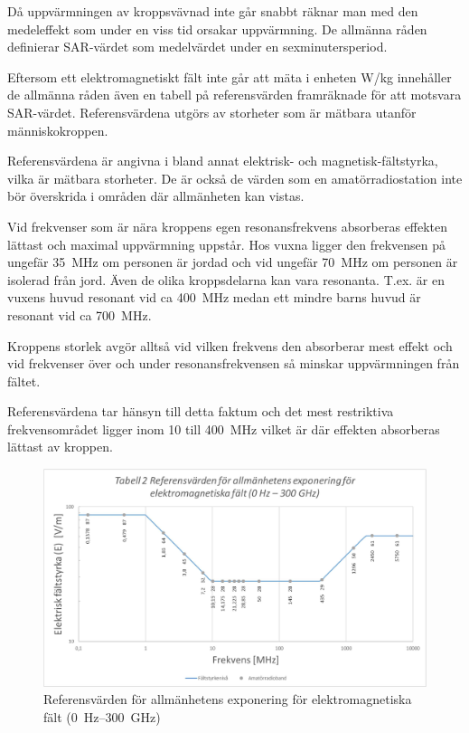 Då uppvärmningen av kroppsvävnad inte går snabbt räknar man med den
medeleffekt som under en viss tid orsakar uppvärmning.
De allmänna råden definierar SAR-värdet som medelvärdet under en
sexminutersperiod.

Eftersom ett elektromagnetiskt fält inte går att mäta i enheten W/kg
innehåller de allmänna råden även en tabell på referensvärden
framräknade för att motsvara SAR-värdet.
Referensvärdena utgörs av storheter som är mätbara utanför människokroppen.

Referensvärdena är angivna i bland annat elektrisk- och
magnetisk-fältstyrka, vilka är mätbara storheter.
De är också de värden som en amatörradiostation inte bör överskrida i områden
där allmänheten kan vistas.

Vid frekvenser som är nära kroppens egen resonansfrekvens absorberas
effekten lättast och maximal uppvärmning uppstår.
Hos vuxna ligger den frekvensen på ungefär 35~MHz om personen är jordad och vid
ungefär 70~MHz om personen är isolerad från jord.
Även de olika kroppsdelarna kan vara resonanta.
T.ex. är en vuxens huvud resonant vid ca 400~MHz medan ett mindre barns huvud
är resonant vid ca 700~MHz.

Kroppens storlek avgör alltså vid vilken frekvens den absorberar mest effekt och
vid frekvenser över och under resonansfrekvensen så minskar uppvärmningen från
fältet.

Referensvärdena tar hänsyn till detta faktum och det mest restriktiva
frekvensområdet ligger inom 10 till 400~MHz vilket är där effekten
absorberas lättast av kroppen.

\begin{figure}[ht]
\begin{center}
\includegraphics[width=14cm]{images/emfbild-000}
\caption{Referensvärden för allmänhetens exponering för elektromagnetiska fält (0~Hz--300~GHz)}
\label{fig:emf1}
\end{center}
\end{figure}

